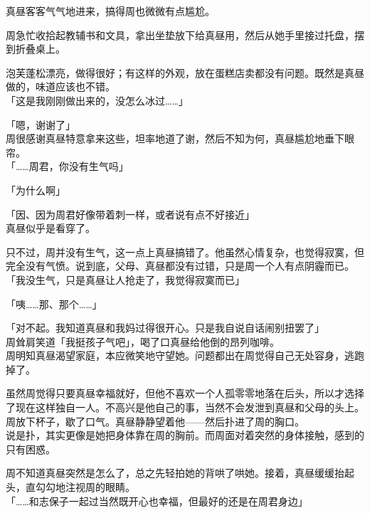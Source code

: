 真昼客客气气地进来，搞得周也微微有点尴尬。

周急忙收拾起教辅书和文具，拿出坐垫放下给真昼用，然后从她手里接过托盘，摆到折叠桌上。

泡芙蓬松漂亮，做得很好；有这样的外观，放在蛋糕店卖都没有问题。既然是真昼做的，味道应该也不错。\\

「这是我刚刚做出来的，没怎么冰过……」

「嗯，谢谢了」\\

周很感谢真昼特意拿来这些，坦率地道了谢，然后不知为何，真昼尴尬地垂下眼帘。\\

「……周君，你没有生气吗」

「为什么啊」

「因、因为周君好像带着刺一样，或者说有点不好接近」\\

真昼似乎是看穿了。

只不过，周并没有生气，这一点上真昼搞错了。他虽然心情复杂，也觉得寂寞，但完全没有气愤。说到底，父母、真昼都没有过错，只是周一个人有点阴霾而已。\\

「我没生气，只是真昼让人抢走了，我觉得寂寞而已」

「咦……那、那个……」

「对不起。我知道真昼和我妈过得很开心。只是我自说自话闹别扭罢了」\\

周耸肩笑道「我挺孩子气吧」，喝了口真昼给他倒的昂列咖啡。\\

周明知真昼渴望家庭，本应微笑地守望她。问题都出在周觉得自己无处容身，逃跑掉了。

虽然周觉得只要真昼幸福就好，但他不喜欢一个人孤零零地落在后头，所以才选择了现在这样独自一人。不高兴是他自己的事，当然不会发泄到真昼和父母的头上。\\

周放下杯子，歇了口气。真昼静静望着他——然后扑进了周的胸口。\\

说是扑，其实更像是她把身体靠在周的胸前。而周面对着突然的身体接触，感到的只有困惑。

周不知道真昼突然是怎么了，总之先轻拍她的背哄了哄她。接着，真昼缓缓抬起头，直勾勾地注视周的眼睛。\\

「……和志保子一起过当然既开心也幸福，但最好的还是在周君身边」\\

